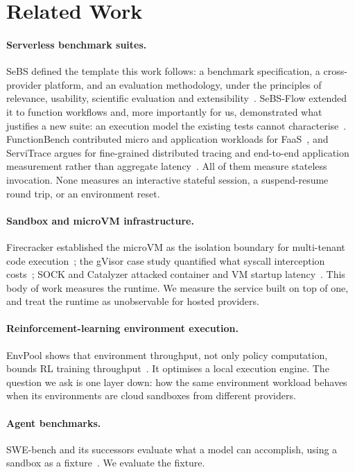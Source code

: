 \section{Related Work}
\label{sec:related}

\paragraph{Serverless benchmark suites.} SeBS defined the template this work
follows: a benchmark specification, a cross-provider platform, and an
evaluation methodology, under the principles of relevance, usability,
scientific evaluation and extensibility~\cite{sebs2021}. SeBS-Flow extended it
to function workflows and, more importantly for us, demonstrated what
justifies a new suite: an execution model the existing tests cannot
characterise~\cite{sebsflow2025}. FunctionBench contributed micro and
application workloads for FaaS~\cite{functionbench2019}, and ServiTrace argues
for fine-grained distributed tracing and end-to-end application measurement
rather than aggregate latency~\cite{servitrace2025}. All of them measure
stateless invocation. None measures an interactive stateful session, a
suspend-resume round trip, or an environment reset.

\paragraph{Sandbox and microVM infrastructure.} Firecracker established the
microVM as the isolation boundary for multi-tenant
code execution~\cite{firecracker2020}; the gVisor case study quantified what
syscall interception costs~\cite{gvisor2019}; SOCK and Catalyzer attacked
container and VM startup latency~\cite{sock2018,catalyzer2020}. This body of
work measures the runtime. We measure the service built on top of one, and
treat the runtime as unobservable for hosted providers.

\paragraph{Reinforcement-learning environment execution.} EnvPool shows that
environment throughput, not only policy computation, bounds RL training
throughput~\cite{envpool2022}. It optimises a local execution engine. The
question we ask is one layer down: how the same environment workload behaves
when its environments are cloud sandboxes from different providers.

\paragraph{Agent benchmarks.} SWE-bench and its successors evaluate what a
model can accomplish, using a sandbox as a fixture~\cite{swebench2024}. We
evaluate the fixture.


